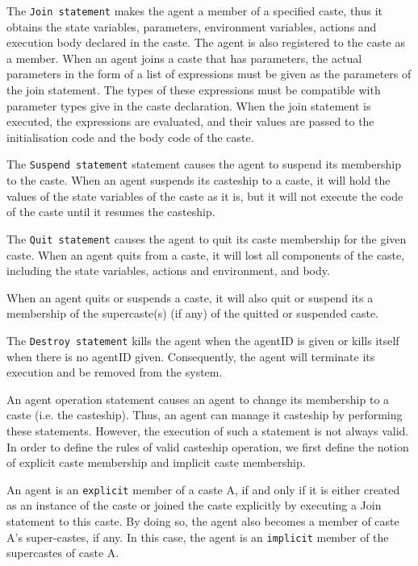 \documentclass[english]{report}
\begin{document}
The \texttt{Join statement} makes the agent a member of a specified caste, thus it obtains the state variables, parameters, environment variables, actions and execution body declared in the caste. The agent is also registered to the caste as a member. When an agent joins a caste that has parameters, the actual parameters in the form of a list 
of expressions must be given as the parameters of the join statement. The types of these expressions must be compatible with parameter types give in the caste declaration. When the join statement is executed, the expressions are evaluated, and their values are passed to the initialisation code and the body code of the caste.  

The \texttt{Suspend statement} statement causes the agent to suspend its membership to the caste. When an agent suspends its casteship to a caste, it will hold the values of the state variables of the caste as it is, but it will not execute the code of the caste until it resumes the casteship. 

The \texttt{Quit statement} causes the agent to quit its caste membership for the given caste. When an agent quits from a caste, it will lost all components of the caste, including the state variables, actions and environment, and body. 
 
When an agent quits or suspends a caste, it will also quit or suspend its a membership of the supercaste(s) (if any) of the quitted or suspended caste. 

The \texttt{Destroy statement} kills the agent when the agentID is given or kills itself when there is no agentID given. Consequently, the agent will terminate its execution and be removed from the system. 

An agent operation statement causes an agent to change its membership to a caste (i.e. the casteship). Thus, an agent can manage it casteship by performing these statements. However, the execution of such a statement is not always valid. In order to define the rules of valid casteship operation, we first define the notion of explicit caste membership and implicit caste membership. 

An agent is an \texttt{explicit} member of a caste A, if and only if it is either created as an instance of the caste or joined the caste explicitly by executing a Join statement to this caste. By doing so, the agent also becomes a member of caste A's super-castes, if any. In this case, the agent is an \texttt{implicit} member of the supercastes of caste A. 
\end{document}

